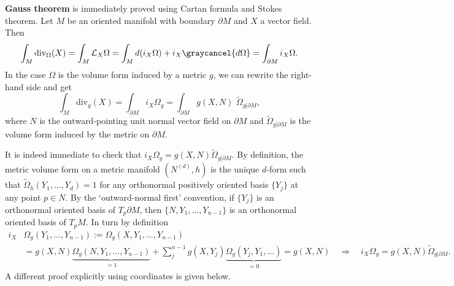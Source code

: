 \begin{mytheorem}
\textbf{Gauss theorem} is immediately proved using Cartan formula and Stokes theorem.
Let $M$ be an oriented manifold with boundary $\partial M$ and $X$ a vector field.
Then
\begin{equation}
    \int_M \mathrm{div}_\Omega (X) = \int_M \mathcal{L}_X \Omega = \int_M d (i_X \Omega) + i_X \graycancel{d\Omega} = \int_{\partial M} i_X \Omega.
\end{equation}
In the case $\Omega$ is the volume form induced by a metric $g$, we can rewrite the right-hand side and get
\begin{equation}
    \int_M \mathrm{div}_g (X) = \int_{\partial M} i_X \Omega_g = \int_{\partial M} g(X, N)\,\, \tilde{\Omega}_{g|\partial M},
\end{equation}
where $N$ is the outward-pointing unit normal vector field on $\partial M$ and $\tilde{\Omega}_{g|\partial M}$ is the volume form induced by the metric on $\partial M$.

It is indeed immediate to check that $i_X \Omega_g = g(X,N) \tilde{\Omega}_{g|\partial M}$.
By definition, the metric volume form on a metric manifold $(N^{(d)},h)$ is the unique $d$-form such that $\tilde{\Omega}_h (Y_1, \dots, Y_d) = 1$ for any orthonormal positively oriented basis $\{Y_j\}$ at any point $p\in N$.
By the `outward-normal first' convention, if $\{Y_j\}$ is an orthonormal oriented basis of $T_p \partial M$, then $\{N, Y_1, \dots, Y_{n-1}\}$ is an orthonormal oriented basis of $T_p M$.
In turn by definition
{\small
\begin{align}
    i_X&\Omega_g(Y_1, \dots, Y_{n-1}):= \Omega_g (X, Y_1, \dots, Y_{n-1})\\
    &= g(X,N) \underbrace{\Omega_g (N, Y_1, \dots, Y_{n-1})}_{=1} + \sum_j^{n-1} g(X,Y_j) \underbrace{\Omega_g(Y_j, Y_1, \dots)}_{=0} = g(X,N)
    \quad \Rightarrow \quad i_X \Omega_g = g(X,N) \tilde{\Omega}_{g|\partial M}. 
\end{align}
}
A different proof explicitly using coordinates is given below.


\end{mytheorem}
